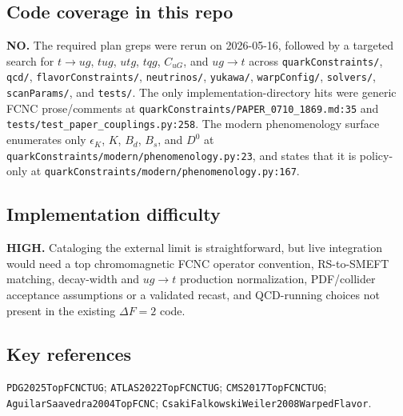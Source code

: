\subsection*{Code coverage in this repo}
\textbf{NO.}  The required plan greps were rerun on 2026-05-16, followed by a
targeted search for \(t\to u g\), \(tug\), \(utg\), \(tqg\), \(C_{uG}\), and
\(ug\to t\) across \texttt{quarkConstraints/}, \texttt{qcd/},
\texttt{flavorConstraints/}, \texttt{neutrinos/}, \texttt{yukawa/},
\texttt{warpConfig/}, \texttt{solvers/}, \texttt{scanParams/}, and
\texttt{tests/}.  The only implementation-directory hits were generic FCNC
prose/comments at \texttt{quarkConstraints/PAPER\_0710\_1869.md:35} and
\texttt{tests/test\_paper\_couplings.py:258}.  The modern phenomenology surface
enumerates only \(\epsilon_K\), \(K\), \(B_d\), \(B_s\), and \(D^0\) at
\texttt{quarkConstraints/modern/phenomenology.py:23}, and states that it is
policy-only at \texttt{quarkConstraints/modern/phenomenology.py:167}.

\subsection*{Implementation difficulty}
\textbf{HIGH.}  Cataloging the external limit is straightforward, but live
integration would need a top chromomagnetic FCNC operator convention,
RS-to-SMEFT matching, decay-width and \(ug\to t\) production normalization,
PDF/collider acceptance assumptions or a validated recast, and QCD-running
choices not present in the existing \(\Delta F=2\) code.

\subsection*{Key references}
\texttt{PDG2025TopFCNCTUG}; \texttt{ATLAS2022TopFCNCTUG};
\texttt{CMS2017TopFCNCTUG}; \texttt{AguilarSaavedra2004TopFCNC};
\texttt{CsakiFalkowskiWeiler2008WarpedFlavor}.
